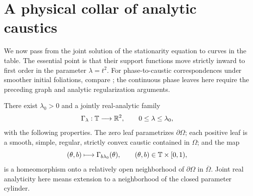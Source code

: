 \section{A physical collar of analytic caustics}\label{sec:caustics}

We now pass from the joint solution of the stationarity equation to
curves in the table. The essential point is that their support functions
move strictly inward to first order in the parameter \(\lambda=t^2\).
For phase-to-caustic correspondences under smoother initial foliations,
compare \citet[Section~2.7]{Glutsyuk2024}; the continuous phase leaves
here require the preceding graph and analytic regularization arguments.

\begin{proposition}\label{prop:physical-collar}
There exist \(\lambda_0>0\) and a jointly real-analytic family
\[
 \Gamma_\lambda:\mathbb{T}\longrightarrow\mathbb{R}^2,
 \qquad 0\leq\lambda\leq\lambda_0,
\]
with the following properties. The zero leaf parametrizes
\(\partial\Omega\); each positive leaf is a smooth, simple, regular,
strictly convex caustic contained in \(\Omega\); and the map
\[
 (\theta,b)\longmapsto\Gamma_{b\lambda_0}(\theta),
 \qquad (\theta,b)\in\mathbb{T}\times[0,1),
\]
is a homeomorphism onto a relatively open neighborhood of
\(\partial\Omega\) in \(\overline\Omega\).
Joint real analyticity here means extension to a neighborhood of the
closed parameter cylinder.
\end{proposition}

